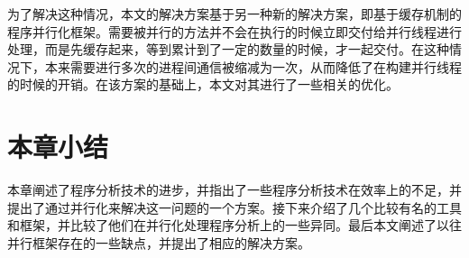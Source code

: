 为了解决这种情况，本文的解决方案基于另一种新的解决方案，即基于缓存机制的程序并行化框架。需要被并行的方法并不会在执行的时候立即交付给并行线程进行处理，而是先缓存起来，等到累计到了一定的数量的时候，才一起交付。在这种情况下，本来需要进行多次的进程间通信被缩减为一次，从而降低了在构建并行线程的时候的开销。在该方案的基础上，本文对其进行了一些相关的优化。

\section{本章小结}

本章阐述了程序分析技术的进步，并指出了一些程序分析技术在效率上的不足，并提出了通过并行化来解决这一问题的一个方案。接下来介绍了几个比较有名的工具和框架，并比较了他们在并行化处理程序分析上的一些异同。最后本文阐述了以往并行框架存在的一些缺点，并提出了相应的解决方案。

